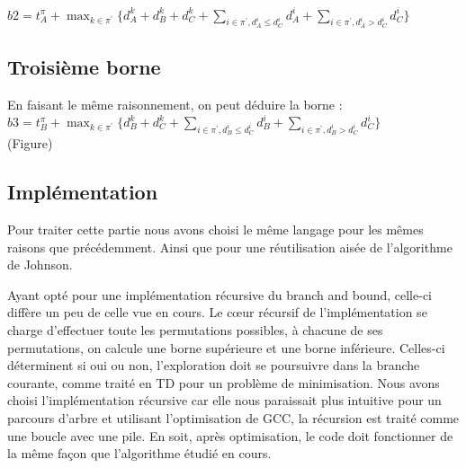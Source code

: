 \documentclass[12pt]{article}
\begin{document}
$b2 = t_A^\pi + \displaystyle\max_{k \in \pi^\prime}\{d_A^k + d_B^k + d_C^k + \displaystyle\sum_{i \in \pi^\prime,d_A^i \le d_C^i} d_A^i + \displaystyle\sum_{i \in \pi^\prime,d_A^i > d_C^i} d_C^i\} $\\

\subsection{Troisième borne}

En faisant le même raisonnement, on peut déduire la borne :\\

$b3 = t_B^\pi + \displaystyle\max_{k \in \pi^\prime}\{d_B^k + d_C^k + \displaystyle\sum_{i \in \pi^\prime,d_B^i \le d_C^i} d_B^i + \displaystyle\sum_{i \in \pi^\prime,d_B^i > d_C^i} d_C^i\} $\\

(Figure)

\subsection{Implémentation}

Pour traiter cette partie nous avons choisi le même langage pour les mêmes raisons que précédemment. Ainsi que pour une réutilisation aisée de l'algorithme de Johnson.

Ayant opté pour une implémentation récursive du branch and bound, celle-ci diffère un peu de celle vue en cours. Le cœur récursif de l'implémentation se charge d'effectuer toute les permutations possibles, à chacune de ses permutations, on calcule une borne supérieure et une borne inférieure. Celles-ci déterminent si oui ou non, l'exploration doit se poursuivre dans la branche courante, comme traité en TD pour un problème de minimisation. Nous avons choisi l'implémentation récursive car elle nous paraissait plus intuitive pour un parcours d'arbre et utilisant l'optimisation de GCC, la récursion est traité comme une boucle avec une pile. En soit, après optimisation, le code doit fonctionner de la même façon que l'algorithme étudié en cours. 






\end{document}
